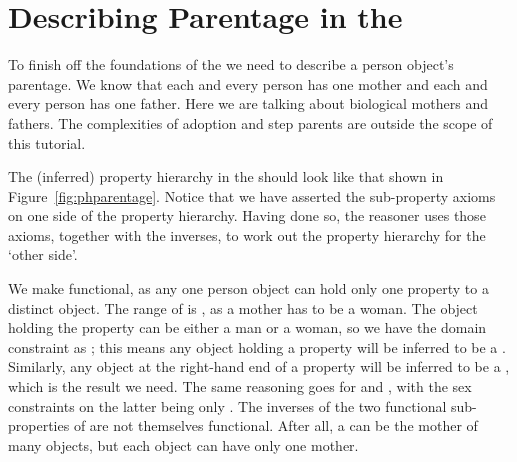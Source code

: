 
\section{Describing Parentage in the \fhkb}
 
To finish off the foundations of the \fhkb we need to describe a person object's parentage. We know that each and every person has one mother and each and every person has one father. Here we are talking about biological mothers and fathers. The complexities of adoption and step parents are outside the  scope of this \fhkb tutorial.

\noindent The (inferred) property hierarchy in the \fhkb should look like that shown in Figure~\ref{fig:phparentage}. Notice that we have asserted the sub-property axioms on one side of the property hierarchy. Having done so, the reasoner uses those axioms, together with the inverses, to work out the property hierarchy for the `other side'.

We make  functional, as any one person object can hold only one  property to a distinct \woman object. The range of  is \woman, as a mother has to be a woman. The \person object holding the  property can be either a man or a woman, so we have the domain constraint as \person; this means any object holding a  property will be inferred to be a \person. Similarly, any object at the right-hand end of a  property will be inferred to be a \woman, which is the result we need. The same reasoning goes for  and , with the sex constraints on the latter being only \person. The inverses of the two functional sub-properties of  are not themselves functional. After all, a \woman can be the mother of many \person objects, but each \person object can   have only one mother.

